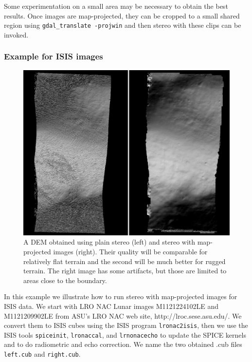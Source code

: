 Some experimentation on a small area may be necessary to obtain the best
results. Once images are map-projected, they can be cropped to a small
shared region using \texttt{gdal\_translate -projwin} and then 
stereo with these clips can be invoked. 

\subsubsection{Example for ISIS images}

\begin{figure}[h!]
\centering
   \includegraphics[width=6.0in]{images/stereo_mapproj_400px.png}
\caption{A DEM obtained using plain stereo (left) and stereo
  with map-projected images (right). Their quality will be comparable
  for relatively flat terrain and the second will be much better for
  rugged terrain. The right image has some artifacts, but those are limited
  to areas close to the boundary.}
\label{fig:mapproj-example}
\end{figure}

In this example we illustrate how to run stereo with map-projected
images for ISIS data. We start with LRO NAC Lunar images M1121224102LE
and M1121209902LE from ASU's LRO NAC web site,
http://lroc.sese.asu.edu/. We convert them to ISIS cubes using the ISIS
program \texttt{lronac2isis}, then we use the ISIS tools
\texttt{spiceinit}, \texttt{lronaccal}, and \texttt{lrnonacecho} to
update the SPICE kernels and to do radiometric and echo correction. We
name the two obtained .cub files \texttt{left.cub} and
\texttt{right.cub}.

